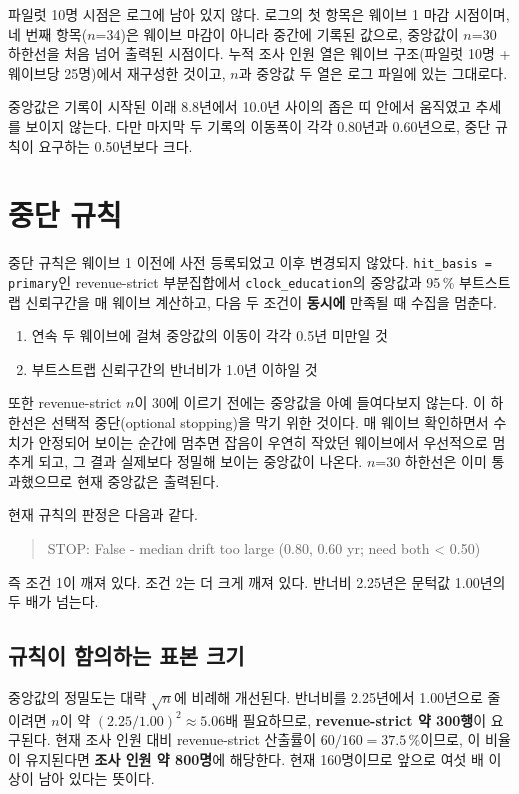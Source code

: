 \documentclass[11pt]{article}
\begin{document}
파일럿 10명 시점은 로그에 남아 있지 않다. 로그의 첫 항목은 웨이브 1 마감 시점이며,
네 번째 항목($n$=34)은 웨이브 마감이 아니라 중간에 기록된 값으로,
중앙값이 $n$=30 하한선을 처음 넘어 출력된 시점이다.
누적 조사 인원 열은 웨이브 구조(파일럿 10명 + 웨이브당 25명)에서 재구성한 것이고,
$n$과 중앙값 두 열은 로그 파일에 있는 그대로다.

중앙값은 기록이 시작된 이래 8.8년에서 10.0년 사이의 좁은 띠 안에서 움직였고 추세를 보이지 않는다.
다만 마지막 두 기록의 이동폭이 각각 0.80년과 0.60년으로,
중단 규칙이 요구하는 0.50년보다 크다.

\section{중단 규칙}

중단 규칙은 웨이브 1 이전에 사전 등록되었고 이후 변경되지 않았다.
\texttt{hit\_basis = primary}인 revenue-strict 부분집합에서
\texttt{clock\_education}의 중앙값과 95\,\% 부트스트랩 신뢰구간을 매 웨이브 계산하고,
다음 두 조건이 \textbf{동시에} 만족될 때 수집을 멈춘다.

\begin{enumerate}
\item 연속 두 웨이브에 걸쳐 중앙값의 이동이 각각 0.5년 미만일 것
\item 부트스트랩 신뢰구간의 반너비가 1.0년 이하일 것
\end{enumerate}

또한 revenue-strict $n$이 30에 이르기 전에는 중앙값을 아예 들여다보지 않는다.
이 하한선은 선택적 중단(optional stopping)을 막기 위한 것이다.
매 웨이브 확인하면서 수치가 안정되어 보이는 순간에 멈추면
잡음이 우연히 작았던 웨이브에서 우선적으로 멈추게 되고,
그 결과 실제보다 정밀해 보이는 중앙값이 나온다.
$n$=30 하한선은 이미 통과했으므로 현재 중앙값은 출력된다.

현재 규칙의 판정은 다음과 같다.

\begin{quote}\ttfamily\small
STOP: False - median drift too large (0.80, 0.60 yr; need both \textless{} 0.50)
\end{quote}

즉 조건 1이 깨져 있다. 조건 2는 더 크게 깨져 있다.
반너비 2.25년은 문턱값 1.00년의 두 배가 넘는다.

\subsection{규칙이 함의하는 표본 크기}

중앙값의 정밀도는 대략 $\sqrt{n}$에 비례해 개선된다.
반너비를 2.25년에서 1.00년으로 줄이려면 $n$이 약 $(2.25/1.00)^2 \approx 5.06$배 필요하므로,
\textbf{revenue-strict 약 300행}이 요구된다.
현재 조사 인원 대비 revenue-strict 산출률이 $60/160 = 37.5\,\%$이므로,
이 비율이 유지된다면 \textbf{조사 인원 약 800명}에 해당한다.
현재 160명이므로 앞으로 여섯 배 이상이 남아 있다는 뜻이다.
\end{document}
